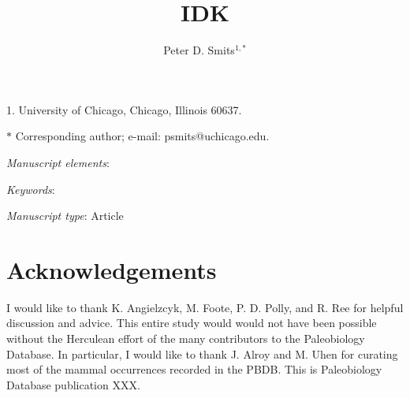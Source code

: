 \documentclass[11pt]{article}
\title{IDK}
\author{Peter D. Smits$^{1, \ast}$\\}
\date{}
\begin{document}
\maketitle

\noindent{}1. University of Chicago, Chicago, Illinois 60637.

\noindent{}$\ast$ Corresponding author; e-mail: psmits@uchicago.edu.

\bigskip

\textit{Manuscript elements}:

\bigskip

\textit{Keywords}:

\bigskip

\textit{Manuscript type}: Article

\bigskip


\linenumbers
\modulolinenumbers[2]

\newpage{}

%





%

%


\section*{Acknowledgements}
I would like to thank K. Angielzcyk, M. Foote, P. D. Polly, and R. Ree for helpful discussion and advice. This entire study would would not have been possible without the Herculean effort of the many contributors to the Paleobiology Database. In particular, I would like to thank J. Alroy and M. Uhen for curating most of the mammal occurrences recorded in the PBDB. This is Paleobiology Database publication XXX.


%
%
\end{document}
